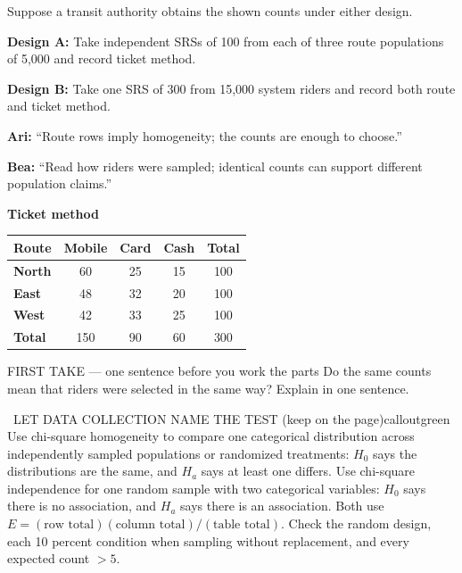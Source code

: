 \documentclass[11pt]{article}
\begin{document}
Suppose a transit authority obtains the shown counts under either design.\par\smallskip \textbf{Design A:} Take independent SRSs of 100 from each of three route populations of 5,000 and record ticket method.\par \textbf{Design B:} Take one SRS of 300 from 15,000 system riders and record both route and ticket method.\par\smallskip \textbf{Ari:} ``Route rows imply homogeneity; the counts are enough to choose.''\par \textbf{Bea:} ``Read how riders were sampled; identical counts can support different population claims.''\par
\begin{center}
\textbf{Ticket method}\par\smallskip
\begin{tabular}{|l|c|c|c|c|}
\hline
\textbf{Route} & \textbf{Mobile} & \textbf{Card} & \textbf{Cash} & \textbf{Total} \\ \hline
\textbf{North} & 60 & 25 & 15 & 100 \\ \hline
\textbf{East} & 48 & 32 & 20 & 100 \\ \hline
\textbf{West} & 42 & 33 & 25 & 100 \\ \hline
\textbf{Total} & 150 & 90 & 60 & 300 \\ \hline
\end{tabular}
\end{center}
\begin{firsttakebox}{FIRST TAKE --- one sentence before you work the parts}
Do the same counts mean that riders were selected in the same way? Explain in one sentence.\par
{}
\end{firsttakebox}

\begin{callout}{\IconBook\ LET DATA COLLECTION NAME THE TEST (keep on the page)}{calloutgreen}
Use chi-square homogeneity to compare one categorical distribution across independently sampled
populations or randomized treatments: $H_0$ says the distributions are the same, and $H_a$ says at least one differs.
Use chi-square independence for one random sample with two categorical variables: $H_0$ says there is no association,
and $H_a$ says there is an association. Both use
$E=(\text{row total})(\text{column total})/(\text{table total})$.
Check the random design, each 10 percent condition when sampling without replacement, and every expected count $>5$.
\end{callout}
\end{document}
